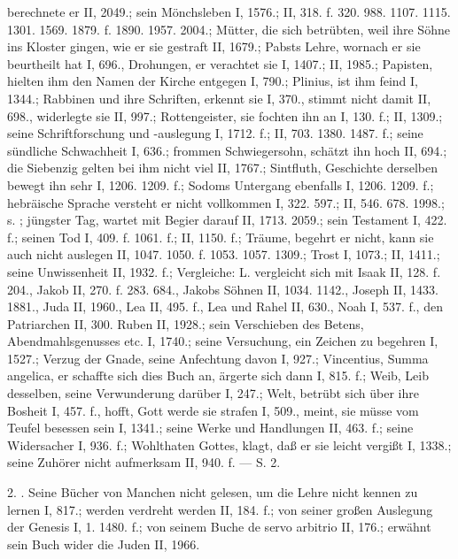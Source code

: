 berechnete er II, 2049.; sein Mönchsleben I, 1576.; II, 318. f. 320. 988. 1107. 1115. 1301. 1569. 1879. f. 1890. 1957. 2004.; Mütter, die sich betrübten, weil ihre Söhne ins Kloster gingen, wie er sie gestraft II, 1679.; Pabsts Lehre, wornach er sie beurtheilt hat I, 696., Drohungen, er verachtet sie I, 1407.; II, 1985.; Papisten, hielten ihm den Namen der Kirche entgegen I, 790.; Plinius, ist ihm feind I, 1344.; Rabbinen und ihre Schriften, erkennt sie I, 370., stimmt nicht damit II, 698., widerlegte sie II, 997.; Rottengeister, sie fochten ihn an I, 130. f.; II, 1309.; seine Schriftforschung und -auslegung I, 1712. f.; II, 703. 1380. 1487. f.; seine sündliche Schwachheit I, 636.; frommen Schwiegersohn, schätzt ihn hoch II, 694.; die Siebenzig gelten bei ihm nicht viel II, 1767.; Sintfluth, Geschichte derselben bewegt ihn sehr I, 1206. 1209. f.; Sodoms Untergang ebenfalls I, 1206. 1209. f.; hebräische Sprache versteht er nicht vollkommen I, 322. 597.; II, 546. 678. 1998.; s. ; jüngster Tag, wartet mit Begier darauf II, 1713. 2059.; sein Testament I, 422. f.; seinen Tod I, 409. f. 1061. f.; II, 1150. f.; Träume, begehrt er nicht, kann sie auch nicht auslegen II, 1047. 1050. f. 1053. 1057. 1309.; Trost I, 1073.; II, 1411.; seine Unwissenheit II, 1932. f.; Vergleiche: L. vergleicht sich mit Isaak II, 128. f. 204., Jakob II, 270. f. 283. 684., Jakobs Söhnen II, 1034. 1142., Joseph II, 1433. 1881., Juda II, 1960., Lea II, 495. f., Lea und Rahel II, 630., Noah I, 537. f., den Patriarchen II, 300. Ruben II, 1928.; sein Verschieben des Betens, Abendmahlsgenusses etc. I, 1740.; seine Versuchung, ein Zeichen zu begehren I, 1527.; Verzug der Gnade, seine Anfechtung davon I, 927.; Vincentius, Summa angelica, er schaffte sich dies Buch an, ärgerte sich dann I, 815. f.; Weib, Leib desselben, seine Verwunderung darüber I, 247.; Welt, betrübt sich über ihre Bosheit I, 457. f., hofft, Gott werde sie strafen I, 509., meint, sie müsse vom Teufel besessen sein I, 1341.; seine Werke und Handlungen II, 463. f.; seine Widersacher I, 936. f.; Wohlthaten Gottes, klagt, daß er sie leicht vergißt I, 1338.; seine Zuhörer nicht aufmerksam II, 940. f. — S.  2.

2. . Seine Bücher von Manchen nicht gelesen, um die Lehre nicht kennen zu lernen I, 817.; werden verdreht werden II, 184. f.; von seiner großen Auslegung der Genesis I, 1. 1480. f.; von seinem Buche de servo arbitrio II, 176.; erwähnt sein Buch wider die Juden II, 1966.

